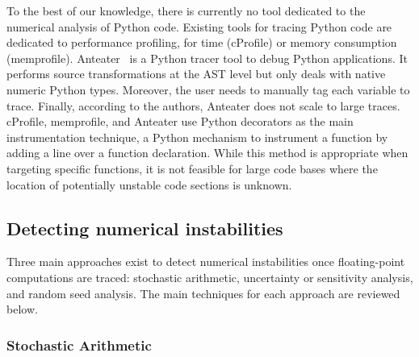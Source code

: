 \documentclass[11pt]{article}
\begin{document}
To the best of our knowledge, there is currently no tool dedicated to the numerical analysis of Python code. Existing tools for tracing Python code are dedicated to performance profiling, for time (cProfile) 
or memory consumption (memprofile). 
Anteater~\cite{faust2019anteater} is a Python tracer tool to debug Python applications. 
It performs source transformations at the AST level but only deals with native numeric Python types.
Moreover, the user needs to manually tag each variable to trace. Finally, according to the authors, Anteater does not scale to large traces.
cProfile, memprofile, and Anteater use Python decorators as the main instrumentation technique, a Python mechanism to instrument a function by adding a line over a function declaration.
While this method is appropriate when targeting specific functions, it is not feasible for large code bases where the location of potentially unstable code sections is unknown.


\label{sec:detecting-instabilities}
\subsection{Detecting numerical instabilities}

Three main approaches exist to detect numerical instabilities once floating-point computations are traced: stochastic arithmetic, uncertainty or sensitivity analysis, and random seed analysis. The main techniques for each approach are reviewed below. 


\label{sec:mca}
\subsubsection{Stochastic Arithmetic}

\end{document}
